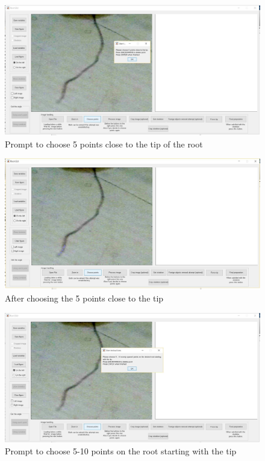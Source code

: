 \begin{figure}[H]
	\centering
	\includegraphics[width=\textwidth]{../Figures/manual/step7.jpg}
	\caption{Prompt to choose 5 points close to the tip of the root}
	\label{fig:img10}
\end{figure}

\begin{figure}[H]
	\centering
	\includegraphics[width=\textwidth]{../Figures/manual/step8.jpg}
	\caption{After choosing the 5 points close to the tip}
	\label{fig:img11}
\end{figure}

\begin{figure}[H]
	\centering
	\includegraphics[width=\textwidth]{../Figures/manual/step9.jpg}
	\caption{Prompt to choose 5-10 points on the root starting with the tip}
	\label{fig:img12}
\end{figure}

